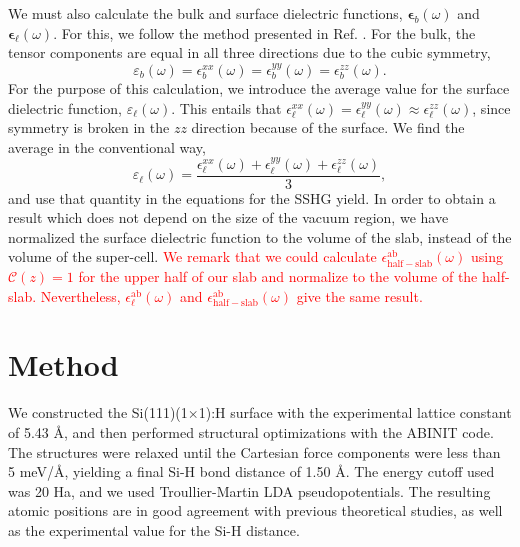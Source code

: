 \documentclass[prb,superscriptaddress,showpacs,twocolumn,letterpaper]{revtex4}
\newcommand{\correction}[1]{\textcolor{red}{#1}}
\begin{document}
We must also calculate the bulk and surface dielectric functions,
$\boldsymbol{\epsilon}_b(\omega)$ and $\boldsymbol{\epsilon}_\ell(\omega)$. For
this, we follow the method presented in Ref. . For the
bulk, the tensor components are equal in all three directions due to the cubic
symmetry,
\begin{equation*}
\varepsilon_{b}(\omega) = 
\epsilon^{xx}_{b}(\omega) = 
\epsilon^{yy}_{b}(\omega) = 
\epsilon^{zz}_{b}(\omega).
\end{equation*}
For the purpose of this calculation, we introduce the average value for the
surface dielectric function, $\varepsilon_\ell(\omega)$. This entails that
$\epsilon^{xx}_{\ell}(\omega) = \epsilon^{yy}_{\ell}(\omega) \approx
\epsilon^{zz}_{\ell}(\omega)$, since symmetry is broken in the $zz$ direction
because of the surface. We find the average in the conventional way,
\begin{equation*}
\varepsilon_{\ell}(\omega) = 
\frac{\epsilon^{xx}_{\ell}(\omega) + 
\epsilon^{yy}_{\ell}(\omega) + 
\epsilon^{zz}_{\ell}(\omega)}{3},
\end{equation*}
and use that quantity in the equations for the SSHG yield. In order to obtain a
result which does not depend on the size of the vacuum
region,\cite{nicolasPRB15} we have normalized the surface dielectric function to
the volume of the slab, instead of the volume of the super-cell.
\correction{We remark that we could calculate
$\epsilon^{\mathrm{ab}}_{\mathrm{half-slab}}(\omega)$ using
${\mathcal{C}}(z)=1$ for the upper half of our slab and normalize to
the volume of the half-slab. Nevertheless,
$\epsilon^{\mathrm{ab}}_{\ell}(\omega)$ and
$\epsilon^{\mathrm{ab}}_{\mathrm{half-slab}}(\omega)$ give the same
result.\cite{hoganPRB03, castilloPRB03, nicolasPRB15}} %


\section{Method}\label{sec:method}

We constructed the Si(111)(1$\times$1):H surface with the experimental lattice
constant of 5.43 \AA, and then performed structural optimizations with the
ABINIT\cite{gonzeCPS09, abinit} code. The structures were relaxed until the
Cartesian force components were less than 5 meV/\AA, yielding a final Si-H bond
distance of 1.50 \AA. The energy cutoff used was 20 Ha, and we used
Troullier-Martin LDA pseudopotentials.\cite{troullierPRB91} The resulting atomic
positions are in good agreement with previous theoretical studies,
\cite{kaxirasPRB88, jonaPRB95, alfonsoPRB96, cargnoniJOCP00, mejiaPRB02} as well
as the experimental value for the Si-H distance.\cite{weastCRC88}
\end{document}
